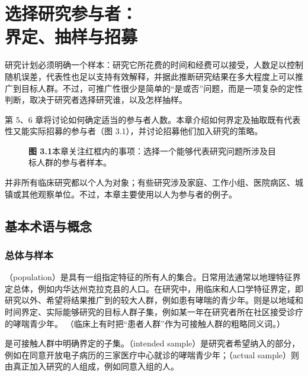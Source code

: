 \chapter[选择研究参与者：界定、抽样与招募]{选择研究参与者：\\界定、抽样与招募}

研究计划必须明确一个样本：研究它所花费的时间和经费可以接受，人数足以控制随机误差，代表性也足以支持有效解释，并据此推断研究结果在多大程度上可以推广到目标人群。不过，可推广性很少是简单的“是或否”问题，而是一项复杂的定性判断，取决于研究者选择研究谁，以及怎样抽样。

第 5、6 章将讨论如何确定适当的参与者人数。本章介绍如何界定及抽取既有代表性又能实际招募的参与者（图 3.1），并讨论招募他们加入研究的策略。
\par
\begin{figure}[htbp]\centering
\resizebox{\linewidth}{!}{\chthreeoverview}
\caption*{\textbf{图 3.1}\quad 本章关注红框内的事项：选择一个能够代表研究问题所涉及目标人群的参与者样本。}
\end{figure}\par
并非所有临床研究都以个人为对象；有些研究涉及家庭、工作小组、医院病区、城镇或其他观察单位。不过，本章主要使用以人为参与者的例子。

\section{基本术语与概念}
\subsection{总体与样本}
（population）是具有一组指定特征的所有人的集合。日常用法通常以地理特征界定总体，例如内华达州克拉克县的人口。在研究中，用临床和人口学特征界定，即研究以外、希望将结果推广到的较大人群，例如患有哮喘的青少年。则是以地域和时间界定、实际能够研究的目标人群子集，例如某一年在研究者所在社区接受诊疗的哮喘青少年。
（临床上有时把“患者人群”作为可接触人群的粗略同义词。）

是可接触人群中明确界定的子集。（intended sample）是研究者希望纳入的部分，例如在同意开放电子病历的三家医疗中心就诊的哮喘青少年；（actual sample）则由真正加入研究的人组成，例如同意入组的人。

